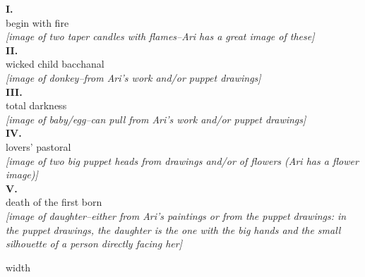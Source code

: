 \documentclass[10pt,letterpaper,landscape]{article}
\newlength{\foldsep}
\newlength{\foldrulewidth}
\newlength{\panelwidth}
\newlength{\panelheight}
\newcommand{\foldrule}{\hspace{\foldsep}\vrule width \foldrulewidth\hspace{\foldsep}}
\newcommand{\panel}[1]{%
  \begin{minipage}[t][\panelheight][t]{\panelwidth}%
    \raggedright #1%
  \end{minipage}%
}
\newcommand{\panellabel}[1]{}
\newcommand{\copysize}{\fontsize{7.05}{7.95}\selectfont}
\begin{document}
\copysize
\noindent
\panel{
  \panellabel{Left Inside Flap}
  {\fontsize{7.2}{8.0}\selectfont
  \textbf{I.}\\
  begin with fire\\[0.2em]
  \textit{[image of two taper candles with flames--Ari has a great image of these]}\\[0.45em]

  \textbf{II.}\\
  wicked child bacchanal\\[0.2em]
  \textit{[image of donkey--from Ari's work and/or puppet drawings]}\\[0.45em]

  \textbf{III.}\\
  total darkness\\[0.2em]
  \textit{[image of baby/egg--can pull from Ari's work and/or puppet drawings]}\\[0.45em]

  \textbf{IV.}\\
  lovers' pastoral\\[0.2em]
  \textit{[image of two big puppet heads from drawings and/or of flowers (Ari has a flower image)]}\\[0.45em]

  \textbf{V.}\\
  death of the first born\\[0.2em]
  \textit{[image of daughter--either from Ari's paintings or from the puppet drawings: in the puppet drawings, the daughter is the one with the big hands and the small silhouette of a person directly facing her]}
  }
}
\foldrule
\end{document}
